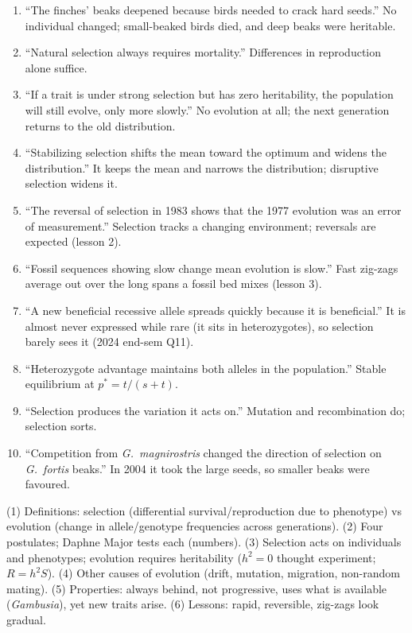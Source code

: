 \begin{statements}
\begin{enumerate}[label=\arabic*.]
\item ``The finches' beaks deepened because birds needed to crack hard seeds.''
\F No individual changed; small-beaked birds died, and deep beaks were heritable.
\item ``Natural selection always requires mortality.''
\F Differences in reproduction alone suffice.
\item ``If a trait is under strong selection but has zero heritability, the population will still evolve, only more slowly.''
\F No evolution at all; the next generation returns to the old distribution.
\item ``Stabilizing selection shifts the mean toward the optimum and widens the distribution.''
\F It keeps the mean and narrows the distribution; disruptive selection widens it.
\item ``The reversal of selection in 1983 shows that the 1977 evolution was an error of measurement.''
\F Selection tracks a changing environment; reversals are expected (lesson 2).
\item ``Fossil sequences showing slow change mean evolution is slow.''
\F Fast zig-zags average out over the long spans a fossil bed mixes (lesson 3).
\item ``A new beneficial recessive allele spreads quickly because it is beneficial.''
\F It is almost never expressed while rare (it sits in heterozygotes), so selection barely sees it (2024 end-sem Q11).
\item ``Heterozygote advantage maintains both alleles in the population.''
\T Stable equilibrium at $p^*=t/(s+t)$.
\item ``Selection produces the variation it acts on.''
\F Mutation and recombination do; selection sorts.
\item ``Competition from \emph{G.\ magnirostris} changed the direction of selection on \emph{G.\ fortis} beaks.''
\T In 2004 it took the large seeds, so smaller beaks were favoured.
\end{enumerate}
\end{statements}

\begin{longans}
(1) Definitions: selection (differential survival/reproduction due to phenotype) vs evolution (change in allele/genotype
frequencies across generations). (2) Four postulates; Daphne Major tests each (numbers). (3) Selection acts on
individuals and phenotypes; evolution requires heritability ($h^2=0$ thought experiment; $R=h^2S$). (4) Other causes of
evolution (drift, mutation, migration, non-random mating). (5) Properties: always behind, not progressive, uses what is
available (\emph{Gambusia}), yet new traits arise. (6) Lessons: rapid, reversible, zig-zags look gradual.
\end{longans}
